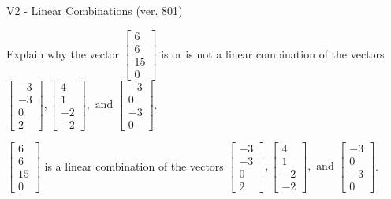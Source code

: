 \begin{exercise}
  \begin{exerciseTitle}V2 - Linear Combinations (ver. 801)\end{exerciseTitle}
  \begin{exerciseStatement}
    Explain why the vector \(\left[\begin{array}{c}
6 \\
6 \\
15 \\
0
\end{array}\right]\)  is or is not a linear 
	combination of the vectors \(\left[\begin{array}{c}
-3 \\
-3 \\
0 \\
2
\end{array}\right] , \left[\begin{array}{c}
4 \\
1 \\
-2 \\
-2
\end{array}\right] , \text{ and } \left[\begin{array}{c}
-3 \\
0 \\
-3 \\
0
\end{array}\right]\).
	


  \end{exerciseStatement}
  \begin{exerciseAnswer}
   \(\left[\begin{array}{c}
6 \\
6 \\
15 \\
0
\end{array}\right]\) 
  	 is  
	a linear combination of the vectors \(\left[\begin{array}{c}
-3 \\
-3 \\
0 \\
2
\end{array}\right] , \left[\begin{array}{c}
4 \\
1 \\
-2 \\
-2
\end{array}\right] , \text{ and } \left[\begin{array}{c}
-3 \\
0 \\
-3 \\
0
\end{array}\right]\).

	
  


  \end{exerciseAnswer}
\end{exercise}
